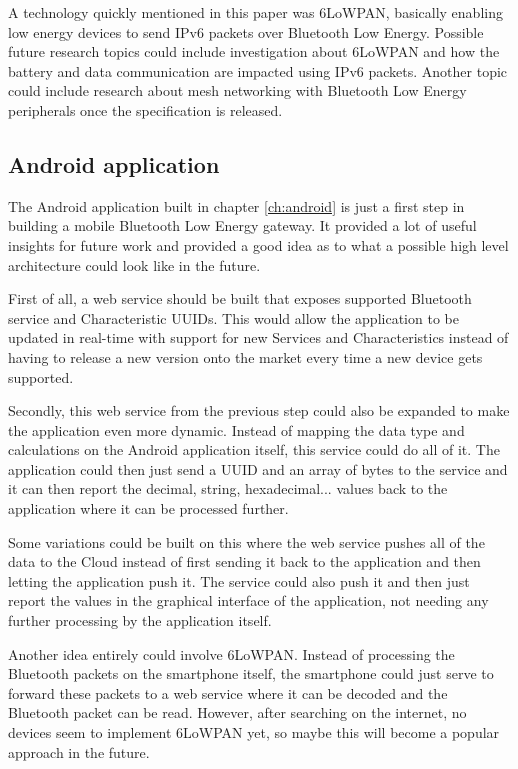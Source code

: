 \documentclass[pdftex,a4paper,12pt,twoside]{report}
\begin{document}
A technology quickly mentioned in this paper was 6LoWPAN, basically enabling low energy devices to send IPv6 packets over Bluetooth Low Energy. Possible future research topics could include investigation about 6LoWPAN and how the battery and data communication are impacted using IPv6 packets. Another topic could include research about mesh networking with Bluetooth Low Energy peripherals once the specification is released.

\subsection{Android application}
\label{subsec:androidapp}
The Android application built in chapter \ref{ch:android} is just a first step in building a mobile Bluetooth Low Energy gateway. It provided a lot of useful insights for future work and provided a good idea as to what a possible high level architecture could look like in the future.

First of all, a web service should be built that exposes supported Bluetooth service and Characteristic UUIDs. This would allow the application to be updated in real-time with support for new Services and Characteristics instead of having to release a new version onto the market every time a new device gets supported.

Secondly, this web service from the previous step could also be expanded to make the application even more dynamic. Instead of mapping the data type and calculations on the Android application itself, this service could do all of it. The application could then just send a UUID and an array of bytes to the service and it can then report the decimal, string, hexadecimal... values back to the application where it can be processed further.

Some variations could be built on this where the web service pushes all of the data to the Cloud instead of first sending it back to the application and then letting the application push it. The service could also push it and then just report the values in the graphical interface of the application, not needing any further processing by the application itself.

Another idea entirely could involve 6LoWPAN. Instead of processing the Bluetooth packets on the smartphone itself, the smartphone could just serve to forward these packets to a web service where it can be decoded and the Bluetooth packet can be read. However, after searching on the internet, no devices seem to implement 6LoWPAN yet, so maybe this will become a popular approach in the future.
\end{document}

